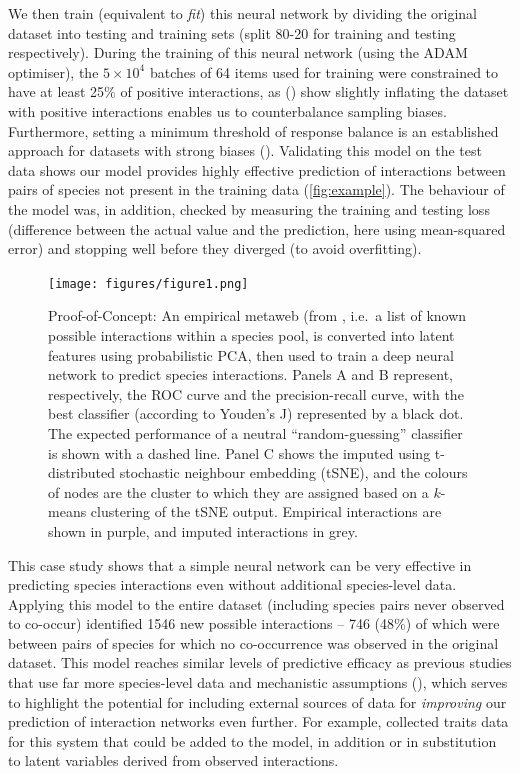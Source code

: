 \begin{refsection}
We then train (equivalent to \emph{fit}) this neural network by dividing
the original dataset into testing and training sets (split 80-20 for
training and testing respectively). During the training of this neural
network (using the ADAM optimiser), the \(5\times 10^4\) batches of 64
items used for training were constrained to have at least 25\% of
positive interactions, as (\cite{Poisot2021ImpMam}) show slightly inflating the
dataset with positive interactions enables us to counterbalance sampling
biases. Furthermore, setting a minimum threshold of response balance is
an established approach for datasets with strong biases
(\cite{Lemaitre2017ImbPyt}). Validating this model on the test data shows
our model provides highly effective prediction of interactions between
pairs of species not present in the training data (\autoref{fig:example}). The
behaviour of the model was, in addition, checked by measuring the
training and testing loss (difference between the actual value and the
prediction, here using mean-squared error) and stopping well before they
diverged (to avoid overfitting).

\begin{figure}[h]
    \centering
    \texttt{[image: figures/figure1.png]}
    \caption{Proof-of-Concept: An empirical metaweb (from
\cite{Hadfield2014TalTwo}, i.e.~a list of known possible interactions
within a species pool, is converted into latent features using
probabilistic PCA, then used to train a deep neural network to predict
species interactions. Panels A and B represent, respectively, the ROC
curve and the precision-recall curve, with the best classifier
(according to Youden's J) represented by a black dot. The expected
performance of a neutral ``random-guessing'' classifier is shown with a
dashed line. Panel C shows the imputed using t-distributed stochastic
neighbour embedding (tSNE), and the colours of nodes are the cluster to
which they are assigned based on a \(k\)-means clustering of the tSNE
output. Empirical interactions are shown in purple, and imputed
interactions in grey.}
    \label{fig:example}
\end{figure}

\clearpage

This case study shows that a simple neural network can be very effective
in predicting species interactions even without additional species-level
data. Applying this model to the entire dataset (including species pairs
never observed to co-occur) identified 1546 new possible interactions --
746 (48\%) of which were between pairs of species for which no
co-occurrence was observed in the original dataset. This model reaches
similar levels of predictive efficacy as previous studies that use far
more species-level data and mechanistic assumptions
(\cite{Gravel2013InfFoo}), which serves to highlight the potential for
including external sources of data for \emph{improving} our prediction
of interaction networks even further. For example, \cite{Krasnov2016TraPhy}
collected traits data for this system that could be added to the model,
in addition or in substitution to latent variables derived from observed
interactions.


\end{refsection}
